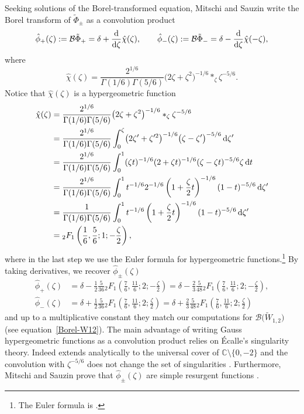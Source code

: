 \documentclass[10pt,a4paper]{amsart}
\newcommand{\C}{\mathbb{C}}
\newcommand{\series}[1]{\tilde{#1}}
\newcommand{\borel}{\mathcal{B}}
\numberwithin{equation}{section}
\begin{document}
Seeking solutions of the Borel-transformed equation, Mitschi and Sauzin write the Borel transform of $\series{\Phi}_{\pm}$ as a convolution product
\begin{align*}
\hat{\phi}_+(\zeta):=\borel\series{\Phi}_+=\delta+\frac{\rm d}{{\rm d}\zeta}\hat{\chi}(\zeta), \qquad \hat{\phi}_-(\zeta):=\borel\series{\Phi}_-=\delta-\frac{\rm d}{{\rm d}\zeta}\hat{\chi}(-\zeta),
\end{align*}
 where
\[
\hat{\chi}(\zeta)=\frac{2^{1/6}}{\Gamma(1/6)\Gamma(5/6)}\bigl(2\zeta+\zeta^2\bigr)^{-1/6} \ast_\zeta \zeta^{-5/6}.
\]
Notice that $\hat{\chi}(\zeta)$ is a hypergeometric function
\begin{align*}
\hat{\chi}(\zeta)&=\frac{2^{1/6}}{\Gamma(1/6)\Gamma(5/6)}\bigl(2\zeta+\zeta^2\bigr)^{-1/6}\ast_\zeta \zeta^{-5/6}\\
&=\frac{2^{1/6}}{\Gamma(1/6)\Gamma(5/6)}\int_0^{\zeta}\bigl(2\zeta'+\zeta'^2\bigr)^{-1/6} \bigl(\zeta-\zeta'\bigr)^{-5/6}\,{\rm d}\zeta'\\
&=\frac{2^{1/6}}{\Gamma(1/6)\Gamma(5/6)}\int_0^{1}(\zeta t)^{-1/6}(2+\zeta t)^{-1/6} (\zeta-\zeta t)^{-5/6} \zeta \,{\rm d}t\\
&=\frac{2^{1/6}}{\Gamma(1/6)\Gamma(5/6)}\int_0^{1} t^{-1/6} 2^{-1/6}\left(1+\frac{\zeta}{2} t\right)^{-1/6} (1-t)^{-5/6}\,{\rm d}\zeta'\\
&=\frac{1}{\Gamma(1/6)\Gamma(5/6)}\int_0^{1} t^{-1/6} \left(1+\frac{\zeta}{2} t\right)^{-1/6} (1-t)^{-5/6}\,{\rm d}\zeta'\\
&={}_2F_1\left(\frac{1}{6},\frac{5}{6};1;-\frac{\zeta}{2}\right),
\end{align*}
where in the last step we use the Euler formula for hypergeometric functions.\footnote{The Euler formula is .
}
By taking derivatives, we recover $\hat{\phi}_{\pm}(\zeta)$
\begin{align*}
\hat{\phi}_+(\zeta)&=\delta-\frac{1}{2}\frac{5}{36} {}_2F_1\left(\frac{7}{6},\frac{11}{6};2;-\frac{\zeta}{2}\right)=\delta-\frac{2}{3}\frac{5}{48} {}_2F_1\left(\frac{7}{6},\frac{11}{6};2;-\frac{\zeta}{2}\right),\\
\hat{\phi}_-(\zeta)&=\delta+\frac{1}{2}\frac{5}{36} {}_2F_1\left(\frac{7}{6},\frac{11}{6};2;\frac{\zeta}{2}\right)=\delta+\frac{2}{3}\frac{5}{48} {}_2F_1\left(\frac{7}{6},\frac{11}{6};2;\frac{\zeta}{2}\right)
\end{align*}
and up to a multiplicative constant they match our computations for $\borel\bigl(\tilde{W}_{1,2}\bigr)$ (see equation~\eqref{Borel-W12}).
The main advantage of writing Gauss hypergeometric functions as a convolution product relies on \'Ecalle's singularity theory. Indeed  extends analytically to the universal cover of $\C\setminus\lbrace 0,-2\rbrace$ and the convolution with $\zeta^{-5/6}$ does not change the set of singularities \cite[Section~6.14.5\,(c)]{diverg-resurg-i}. Furthermore, Mitschi and Sauzin prove that $\hat{\phi}_{\pm}(\zeta)$ are simple resurgent functions \cite[Lemma 6.106]{diverg-resurg-i}.
%
\end{document}
